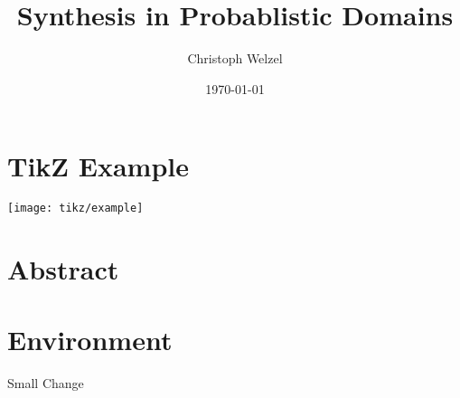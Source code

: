 \documentclass[twoside, a4paper, fontsize=12pt, draft]{scrbook}
\title{Synthesis in Probablistic Domains}
\author{Christoph Welzel}
\date{\today}
\begin{document}
\maketitle
\listoffixmes
\frontmatter
\chapter{TikZ Example}
\texttt{[image: tikz/example]}
\mainmatter
\chapter{Abstract}
\chapter{Environment}
Small Change
\backmatter
\end{document}

